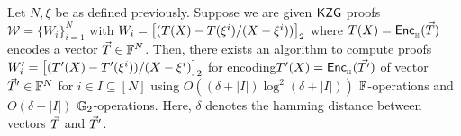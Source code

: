 \begin{lemma}\label{lem:approx-setup}
Let $N,\xi$ be as defined previously. Suppose we are given
$\mathsf{KZG}$ proofs $\mathcal{W}=\{W_i\}_{i=1}^N$ with $W_i=\left[{(T(X) - T(\xi^i)/(X-\xi^i))}\right]_2$ where
$T(X)=\mathsf{Enc}_{{}_{\mathbb{H}}}(\vec{T})$ encodes a vector $\vec{T}\in \mathbb{F}^N$. Then,
there exists an algorithm to compute proofs
$W_i'=\left[{(T'(X) - T'(\xi^i))/(X-\xi^i)}\right]_2$ for encoding$T'(X)=\mathsf{Enc}_{{}_{\mathbb{H}}}(\vec{T'})$ of vector $\vec{T}'\in \mathbb{F}^N$
for $i\in I\subseteq [N]$ using $O((\delta + |I|) \log^2 (\delta + |I|))$ $\mathbb{F}$-operations and $O(\delta + |I|)$ $\mathbb{G}_2$-operations.
Here, $\delta$ denotes the hamming distance
between vectors $\vec{T}$ and $\vec{T}'$.

\end{lemma}